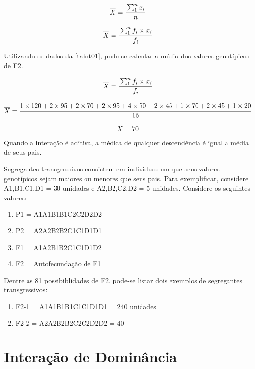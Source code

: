 \begin{equation}
\overline{X} =  \cfrac{\sum_{1}^{n} x_i}{n}
\end{equation}


\begin{equation}
\overline{X} = \cfrac{\sum_{1}^{n} f_i\times{x_i}}{f_i}
\end{equation}

Utilizando os dados da \ref{tab:t01}, pode-se calcular a média dos valores genotípicos de F2.


\begin{equation}
\overline{X} = \cfrac{\sum_{1}^{n} f_i\times{x_i}}{f_i}
\end{equation}

\begin{equation}
\overline{X} = \cfrac{
				1\times{120} + 
				2\times{95}  + 
				2\times{70}  + 
				2\times{95}  + 
				4\times{70}  +
				2\times{45}  + 
				1\times{70}  + 
				2\times{45}  + 
				1\times{20}
				}{16}
\end{equation}


\begin{equation}
\overline{X} = 70
\end{equation}


Quando a interação é aditiva, a médica de qualquer descendência é igual a média de seus pais. 

Segregantes transgressivos consistem em indivíduos em que seus valores genotípicos sejam maiores ou menores que seus pais. Para exemplificar, considere A1,B1,C1,D1 = 30 unidades e A2,B2,C2,D2 = 5 unidades. Considere os seguintes valores:

\begin{enumerate}
\item P1 = A1A1B1B1C2C2D2D2
\item P2 = A2A2B2B2C1C1D1D1
\item F1 = A1A2B1B2C1C1D1D2
\item F2 = Autofecundação de F1
\end{enumerate}

Dentre as 81 possibiblidades de F2, pode-se listar dois exemplos de segregantes transgressivos:

\begin{enumerate}
\item F2-1 = A1A1B1B1C1C1D1D1 = 240 unidades
\item F2-2 = A2A2B2B2C2C2D2D2 = 40
\end{enumerate}

\section{Interação de Dominância}

